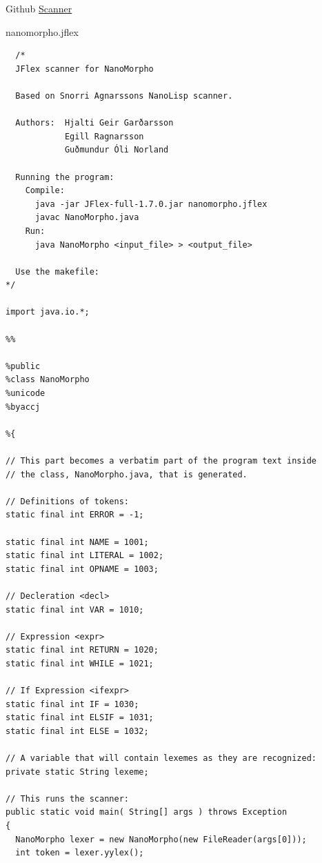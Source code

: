 \documentclass{homework}
\begin{document}

\begin{question}{Github}
  \href{https://github.com/slowpokesheep/thydendur/scanner}{Scanner}\\
\end{question}

\begin{question}{nanomorpho.jflex}
\end{question}
\begin{answer}
\begin{verbatim}
  /*
  JFlex scanner for NanoMorpho

  Based on Snorri Agnarssons NanoLisp scanner.

  Authors:  Hjalti Geir Garðarsson
            Egill Ragnarsson
            Guðmundur Óli Norland
  
  Running the program:
    Compile:
      java -jar JFlex-full-1.7.0.jar nanomorpho.jflex
      javac NanoMorpho.java
    Run:
      java NanoMorpho <input_file> > <output_file>
  
  Use the makefile:
*/

import java.io.*;

%%

%public
%class NanoMorpho
%unicode
%byaccj

%{

// This part becomes a verbatim part of the program text inside
// the class, NanoMorpho.java, that is generated.

// Definitions of tokens:
static final int ERROR = -1;

static final int NAME = 1001;
static final int LITERAL = 1002;
static final int OPNAME = 1003;

// Decleration <decl>
static final int VAR = 1010;

// Expression <expr>
static final int RETURN = 1020;
static final int WHILE = 1021;

// If Expression <ifexpr>
static final int IF = 1030;
static final int ELSIF = 1031;
static final int ELSE = 1032;

// A variable that will contain lexemes as they are recognized:
private static String lexeme;

// This runs the scanner:
public static void main( String[] args ) throws Exception
{
  NanoMorpho lexer = new NanoMorpho(new FileReader(args[0]));
  int token = lexer.yylex();
  

\end{verbatim}
\end{answer}
\end{document}
